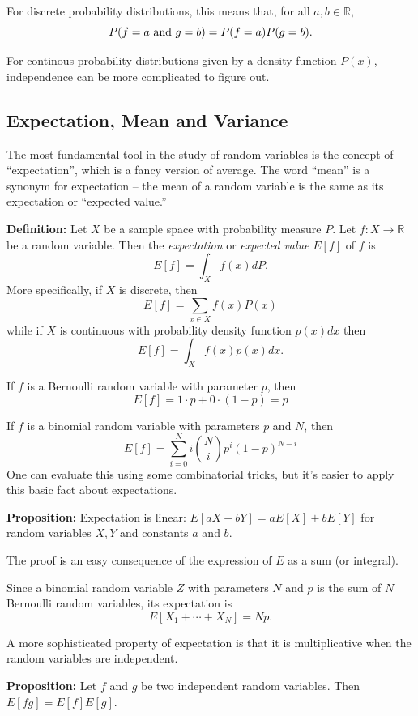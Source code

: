 \documentclass[
  11pt,
  letterpaper,
]{scrbook}
\theoremstyle{plain}
\theoremstyle{remark}
\begin{document}
For discrete probability distributions, this means that, for all
\(a,b\in\mathbb{R}\), \[
P(f=a\hbox{\ and\ }g=b)=P(f=a)P(g=b).
\]

For continous probability distributions given by a density function
\(P(x)\), independence can be more complicated to figure out.

\hypertarget{expectation-mean-and-variance}{%
\subsection{Expectation, Mean and
Variance}\label{expectation-mean-and-variance}}

The most fundamental tool in the study of random variables is the
concept of ``expectation'', which is a fancy version of average. The
word ``mean'' is a synonym for expectation -- the mean of a random
variable is the same as its expectation or ``expected value.''

\textbf{Definition:} Let \(X\) be a sample space with probability
measure \(P\). Let \(f:X\to \mathbb{R}\) be a random variable. Then the
\emph{expectation} or \emph{expected value} \(E[f]\) of \(f\) is \[
E[f] = \int_X f(x)dP.
\] More specifically, if \(X\) is discrete, then \[
E[f] = \sum_{x\in X} f(x)P(x)
\] while if \(X\) is continuous with probability density function
\(p(x)dx\) then \[
E[f] = \int_{X} f(x)p(x)dx.
\]

If \(f\) is a Bernoulli random variable with parameter \(p\), then \[
E[f] = 1\cdot p+0\cdot (1-p) = p
\]

If \(f\) is a binomial random variable with parameters \(p\) and \(N\),
then \[
E[f] = \sum_{i=0}^{N} i\binom{N}{i}p^{i}(1-p)^{N-i}
\] One can evaluate this using some combinatorial tricks, but it's
easier to apply this basic fact about expectations.

\textbf{Proposition:} Expectation is linear: \(E[aX+bY]=aE[X]+bE[Y]\)
for random variables \(X,Y\) and constants \(a\) and \(b\).

The proof is an easy consequence of the expression of \(E\) as a sum (or
integral).

Since a binomial random variable \(Z\) with parameters \(N\) and \(p\)
is the sum of \(N\) Bernoulli random variables, its expectation is \[
E[X_1+\cdots+X_N]=Np.
\]

A more sophisticated property of expectation is that it is
multiplicative when the random variables are independent.

\textbf{Proposition:} Let \(f\) and \(g\) be two independent random
variables. Then \(E[fg]=E[f]E[g]\).
\end{document}
